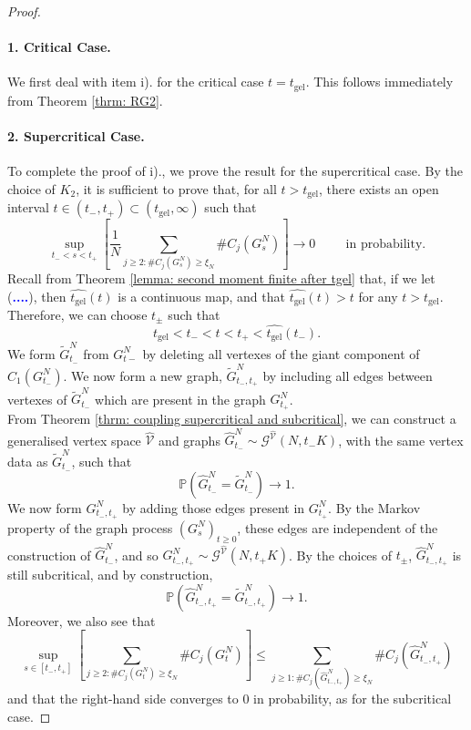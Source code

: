 \begin{proof}
\paragraph{1. Critical Case.} We first deal with item i). for the critical case $t=t_\text{gel}$. This follows immediately from Theorem \ref{thrm: RG2}.
\paragraph{2. Supercritical Case.} To complete the proof of i)., we prove the result for the supercritical case. By the choice of $K_2$, it is sufficient to prove that, for all $t>t_\text{gel}$, there exists an open interval $t \in (t_-, t_+) \subset (t_\text{gel}, \infty)$ such that
\begin{equation}
    \sup_{t_-<s<t_+}\left[\frac{1}{N}\sum_{j\geq 2: \#C_j(G^N_s)\geq \xi_N} \#C_j(G^N_s)\right] \rightarrow 0 \hspace{1cm}\text{in probability.}
\end{equation} Recall from Theorem \ref{lemma: second moment finite after tgel} that, if we let (\textcolor{blue}{\textbf{....}}), then $\widehat{t_\text{gel}}(t)$ is a continuous map, and that $\widehat{t_\text{gel}}(t)>t$ for any $t>t_\text{gel}.$ Therefore, we can choose $t_\pm$ such that
\begin{equation}
    t_\text{gel}<t_-<t<t_+<\widehat{t_\text{gel}}(t_-).
\end{equation} We form $\widetilde{G}^N_{t_-}$ from $G^N_{t-}$ by deleting all vertexes of the giant component of $C_1(G^N_{t_-})$. We now form a new graph, $\widetilde{G}^N_{t_-,t_+}$ by including all edges between vertexes of $\widetilde{G}^N_{t_-}$ which are present in the graph $G^N_{t_+}$. \medskip \\ From Theorem \ref{thrm: coupling supercritical and subcritical}, we can construct a generalised vertex space $\widehat{\mathcal{V}}$ and graphs $\widehat{G}^N_{t_-}\sim \mathcal{G}^{\widehat{\mathcal{V}}}(N,t_-K)$, with the same vertex data as $\widetilde{G}^N_{t_-}$, such that \begin{equation}
    \mathbb{P}\left(\widehat{G}^N_{t_-}=\widetilde{G}^N_{t_-}\right)\rightarrow 1.
\end{equation} We now form $G^N_{t_-,t_+}$ by adding those edges present in $G^N_{t_+}$. By the Markov property of the graph process $(G^N_s)_{t\geq 0}$, these edges are independent of the construction of $\widehat{G}^N_{t_-}$, and so $G^N_{t_-,t_+}\sim \mathcal{G}^{\widehat{\mathcal{V}}}(N,t_+K)$. By the choices of $t_\pm$, $\widehat{G}^N_{t_-,t_+}$ is still subcritical, and by construction, \begin{equation}
    \mathbb{P}\left(\widehat{G}^N_{t_-, t_+}=\widetilde{G}^N_{t_-, t_+}\right)\rightarrow 1.
\end{equation} Moreover, we also see that \begin{equation}
    \sup_{s\in [t_-, t_+]} \left[\sum_{j\geq 2: \#C_j(G^N_t)\geq \xi_N} \#C_j(G^N_t)\right] \leq \sum_{j\geq 1: \#C_j(\widehat{G}^N_{t_-,t_+})\geq \xi_N} \#C_j(\widehat{G}^N_{t_-,t_+})
\end{equation} and that the right-hand side converges to $0$ in probability, as for the subcritical case.

\end{proof}
